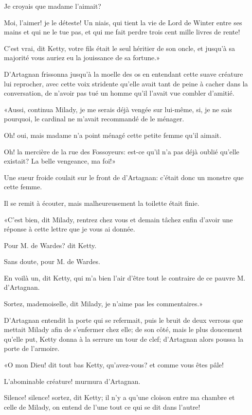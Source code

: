 \speak  Je croyais que madame l'aimait? 

\speak  Moi, l'aimer! je le déteste! Un niais, qui tient la vie de Lord de Winter entre ses mains et qui ne le tue pas, et qui me fait perdre trois cent mille livres de rente! 

\speak  C'est vrai, dit Ketty, votre fils était le seul héritier de son oncle, et jusqu'à sa majorité vous auriez eu la jouissance de sa fortune.» 

D'Artagnan frissonna jusqu'à la moelle des os en entendant cette suave créature lui reprocher, avec cette voix stridente qu'elle avait tant de peine à cacher dans la conversation, de n'avoir pas tué un homme qu'il l'avait vue combler d'amitié. 

«Aussi, continua Milady, je me serais déjà vengée sur lui-même, si, je ne sais pourquoi, le cardinal ne m'avait recommandé de le ménager. 

\speak  Oh! oui, mais madame n'a point ménagé cette petite femme qu'il aimait. 

\speak  Oh! la mercière de la rue des Fossoyeurs: est-ce qu'il n'a pas déjà oublié qu'elle existait? La belle vengeance, ma foi!» 

Une sueur froide coulait sur le front de d'Artagnan: c'était donc un monstre que cette femme. 

Il se remit à écouter, mais malheureusement la toilette était finie. 

«C'est bien, dit Milady, rentrez chez vous et demain tâchez enfin d'avoir une réponse à cette lettre que je vous ai donnée. 

\speak  Pour M. de Wardes? dit Ketty. 

\speak  Sans doute, pour M. de Wardes. 

\speak  En voilà un, dit Ketty, qui m'a bien l'air d'être tout le contraire de ce pauvre M. d'Artagnan. 

\speak  Sortez, mademoiselle, dit Milady, je n'aime pas les commentaires.» 

D'Artagnan entendit la porte qui se refermait, puis le bruit de deux verrous que mettait Milady afin de s'enfermer chez elle; de son côté, mais le plus doucement qu'elle put, Ketty donna à la serrure un tour de clef; d'Artagnan alors poussa la porte de l'armoire. 

«O mon Dieu! dit tout bas Ketty, qu'avez-vous? et comme vous êtes pâle! 

\speak  L'abominable créature! murmura d'Artagnan. 

\speak  Silence! silence! sortez, dit Ketty; il n'y a qu'une cloison entre ma chambre et celle de Milady, on entend de l'une tout ce qui se dit dans l'autre! 

